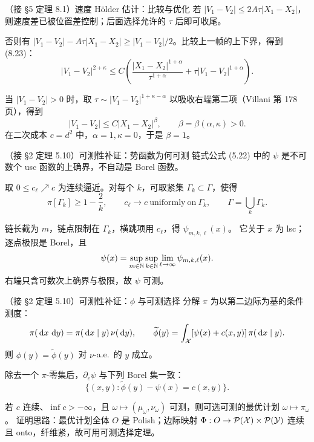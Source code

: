 \begin{frame}{（接 §5 定理 8.1）速度 Hölder 估计：比较与优化}
  若 $|V_{1}-V_{2}|\le 2A\tau |X_{1}-X_{2}|$，则速度差已被位置差控制；后面选择允许的 $\tau$ 后即可收尾。

  否则有 $|V_{1}-V_{2}|-A\tau |X_{1}-X_{2}|\ge |V_{1}-V_{2}|/2$。比较上一帧的上下界，得到 (8.23)：
  \[
    |V_{1}-V_{2}|^{2+\kappa}
    \le
    C\!\left(
      \frac{|X_{1}-X_{2}|^{1+\alpha}}{\tau^{1+\alpha}}
      +\tau |V_{1}-V_{2}|^{1+\alpha}
    \right).
  \]

  当 $|V_{1}-V_{2}|>0$ 时，取 $\tau\sim|V_{1}-V_{2}|^{1+\kappa-\alpha}$
  以吸收右端第二项（Villani 第 178 页），得到
  \[
    |V_{1}-V_{2}|\le C|X_{1}-X_{2}|^{\beta},
    \qquad \beta=\beta(\alpha,\kappa)>0.
  \]
  在二次成本 $c=d^{2}$ 中，$\alpha=1,\kappa=0$，于是 $\beta=1$。

\end{frame}

\begin{frame}{（接 §2 定理 5.10）可测性补证：势函数为何可测}
  链式公式 (5.22) 中的 $\psi$ 是不可数个 usc 函数的上确界，不自动是 Borel 函数。

  取 $0\le c_{\ell}\nearrow c$ 为连续逼近。对每个 $k$，可取紧集 $\Gamma_{k}\subset\Gamma$，使得
  \[
    \pi[\Gamma_{k}]\ge 1-\frac{2}{k},\qquad
    c_{\ell}\to c\ \mathrm{uniformly\ on}\ \Gamma_{k},\qquad
    \Gamma=\bigcup_{k}\Gamma_{k}.
  \]

  链长截为 $m$，链点限制在 $\Gamma_{k}$，横跳项用 $c_{\ell}$，得 $\psi_{m,k,\ell}(x)$。
  它关于 $x$ 为 lsc；逐点极限是 Borel，且
  \[
    \psi(x)=\sup_{m\in\mathbb{N}}\sup_{k\in\mathbb{N}}\lim_{\ell\to\infty}\psi_{m,k,\ell}(x).
  \]
  右端只含可数次上确界与极限，故 $\psi$ 可测。

\end{frame}

\begin{frame}{（接 §2 定理 5.10）可测性补证：$\phi$ 与可测选择}
  分解 $\pi$ 为以第二边际为基的条件测度：
  \[
    \pi(\,\mathrm{d} x\,\,\mathrm{d} y)=\pi(\,\mathrm{d} x\mid y)\,\nu(\,\mathrm{d} y),
    \qquad
    \widetilde{\phi}(y)=\int_{\mathcal{X}}[\psi(x)+c(x,y)]\,\pi(\,\mathrm{d} x\mid y).
  \]
  则 $\phi(y)=\widetilde{\phi}(y)$ 对 $\nu$-a.e.\ 的 $y$ 成立。

  除去一个 $\pi$-零集后，$\partial_{c}\psi$ 与下列 Borel 集一致：
  \[
    \{(x,y):\widetilde{\phi}(y)-\psi(x)=c(x,y)\}.
  \]

  若 $c$ 连续、$\inf c>-\infty$，且 $\omega\mapsto(\mu_{\omega},\nu_{\omega})$ 可测，则可选可测的最优计划 $\omega\mapsto\pi_{\omega}$。
  证明思路：最优计划全体 $O$ 是 Polish；边际映射 $\Phi:O\to\mathcal{P}(\mathcal{X})\times\mathcal{P}(\mathcal{Y})$ 连续且 onto，纤维紧，故可用可测选择定理。

\end{frame}
